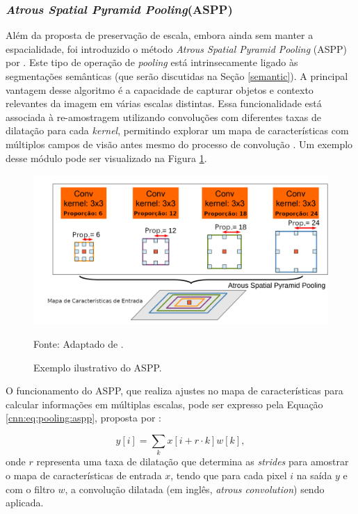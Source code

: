 \subsubsection{\textit{Atrous Spatial Pyramid Pooling}(ASPP)}
\label{cnn:pooling:aspp}
Além da proposta de preservação de escala, embora ainda sem manter a espacialidade, foi introduzido o método \textit{Atrous Spatial Pyramid Pooling} (ASPP) por \cite{Chen2018}. Este tipo de operação de \textit{pooling} está intrinsecamente ligado às segmentações semânticas \citep{Mohan2020} (que serão discutidas na Seção \ref{semantic}). A principal vantagem desse algoritmo é a capacidade de capturar objetos e contexto relevantes da imagem em várias escalas distintas. Essa funcionalidade está associada à re-amostragem utilizando convoluções com diferentes taxas de dilatação para cada \textit{kernel}, permitindo explorar um mapa de características com múltiplos campos de visão antes mesmo do processo de convolução \citep{Chen2018}. Um exemplo desse módulo pode ser visualizado na Figura \ref{cnn:fig:aspp}.

\begin{figure}[H]
    \centering
    \caption{Exemplo ilustrativo do ASPP.}
    \includegraphics[width=1\textwidth]{recursos/imagens/proposal/aspp.png}
    \label{cnn:fig:aspp}

    Fonte: Adaptado de \cite{Chen2018}.
\end{figure}

O funcionamento do ASPP, que realiza ajustes no mapa de características para calcular informações em múltiplas escalas, pode ser expresso pela Equação \ref{cnn:eq:pooling:aspp}, proposta por \cite{Chen2018}:

\begin{equation}
    \label{cnn:eq:pooling:aspp}
    y[i] = \sum_{k}x[i + r \cdot k]w [k],
\end{equation}
onde $r$ representa uma taxa de dilatação que determina as \textit{strides} para amostrar o mapa de características de entrada $x$, tendo que para cada pixel $i$ na saída $y$ e com o filtro $w$, a convolução dilatada (em inglês, \textit{atrous convolution}) sendo aplicada.

